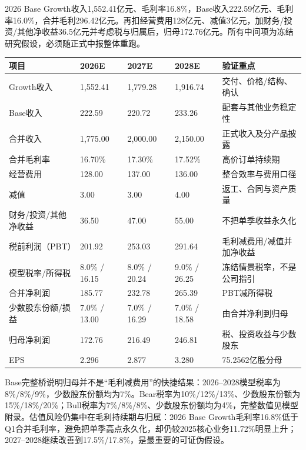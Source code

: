 2026 Base Growth收入1,552.41亿元、毛利率16.8\%，Base收入222.59亿元、毛利率16.0\%，合并毛利296.42亿元。再扣经营费用128亿元、减值3亿元，加财务/投资/其他净收益36.5亿元并考虑税与归属后，归母172.76亿元。所有中间项为冻结研究假设，必须随正式中报整体重跑。

\begin{exhibitbox}[Base分部到合并盈利桥]
\small
\begin{tabularx}{\exhibitboxwidth}{L{3.6cm}R{2.4cm}R{2.4cm}R{2.4cm}X}
\toprule
\textbf{项目} & \textbf{2026E} & \textbf{2027E} & \textbf{2028E} & \textbf{验证重点} \\
\midrule
Growth收入 & 1,552.41 & 1,779.28 & 1,916.74 & 交付、价格/结构、确认 \\
Base收入 & 222.59 & 220.72 & 233.26 & 配套与其他业务稳定性 \\
合并收入 & 1,775.00 & 2,000.00 & 2,150.00 & 正式收入及分产品披露 \\
合并毛利率 & 16.70\% & 17.30\% & 17.52\% & 高价订单持续期 \\
经营费用 & 128.00 & 137.00 & 136.00 & 整合效率与费用口径 \\
减值 & 3.00 & 3.00 & 4.00 & 返工、合同与资产质量 \\
财务/投资/其他净收益 & 36.50 & 47.00 & 55.00 & 不把单季收益永久化 \\
税前利润（PBT） & 201.92 & 253.03 & 291.64 & 毛利减费用/减值并加净收益 \\
模型税率/所得税 & 8.0\% / 16.15 & 8.0\% / 20.24 & 9.0\% / 26.25 & 冻结情景税率，不是公司指引 \\
合并净利润 & 185.77 & 232.78 & 265.39 & PBT减所得税 \\
少数股东份额/损益 & 7.0\% / 13.00 & 7.0\% / 16.29 & 7.0\% / 18.58 & 由合并净利到归母 \\
归母净利润 & 172.76 & 216.49 & 246.81 & 税、投资收益与少数股东 \\
EPS & 2.296 & 2.877 & 3.280 & 75.2562亿股分母 \\
\bottomrule
\end{tabularx}
\end{exhibitbox}

Base完整桥说明归母并不是“毛利减费用”的快捷结果：2026--2028模型税率为8\%/8\%/9\%，少数股东份额均为7\%。Bear税率为10\%/12\%/13\%、少数股东份额为15\%/18\%/20\%；Bull税率为7\%/8\%/8\%、少数股东份额均为4\%，完整数值见模型附录。估值风险仍集中在毛利持续期与归属：2026 Base Growth毛利率16.8\%低于Q1合并毛利率，避免把单季高点永久化，却仍较2025核心业务11.72\%明显上升；2027--2028继续改善到17.5\%/17.8\%，是最重要的可证伪假设。

